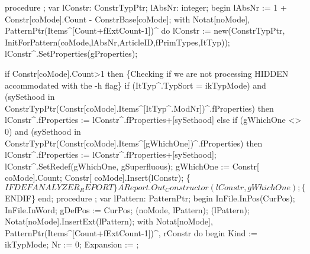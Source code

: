 \nwenddocs{}\endmoddef\nwstartdeflinemarkup{}\nwenddeflinemarkup
procedure ;
var
   lConstr: ConstrTypPtr;
   lAbsNr: integer;
begin
   lAbsNr :=  1 + Constr[coMode].Count - ConstrBase[coMode];
   with Notat[noMode], PatternPtr(Items^[Count+fExtCount-1])^ do
   lConstr := new(ConstrTypPtr,
                  InitForPattern(coMode,lAbsNr,ArticleID,fPrimTypes,ItTyp));
   lConstr^.SetProperties(gProperties);
   
   if Constr[coMode].Count>1 then \{Checking if we are not processing HIDDEN accommodated with the -h flag\}
      if (ItTyp^.TypSort = ikTypMode) and
            (sySethood in ConstrTypPtr(Constr[coMode].Items^[ItTyp^.ModNr])^.fProperties) then
         lConstr^.fProperties := lConstr^.fProperties+[sySethood]
      else if (gWhichOne <> 0) and
                 (sySethood in ConstrTypPtr(Constr[coMode].Items^[gWhichOne])^.fProperties) then
         lConstr^.fProperties := lConstr^.fProperties+[sySethood];
   lConstr^.SetRedef(gWhichOne, gSuperfluous);
   gWhichOne :=  Constr[ coMode].Count;
   Constr[ coMode].Insert(lConstr);
   \{$IFDEF ANALYZER_REPORT\}
   AReport.Out_Constructor(lConstr, gWhichOne);
   \{$ENDIF\}
end;
\eatline
{}\nwendcode{}\nwdocspar
\nwenddocs{}\endmoddef\nwstartdeflinemarkup{}\nwenddeflinemarkup
procedure ;
var
   lPattern: PatternPtr;
begin
   InFile.InPos(CurPos);
   InFile.InWord;
   gDefPos := CurPos;
   (noMode, lPattern);
   (lPattern);
   Notat[noMode].InsertExt(lPattern);
   with Notat[noMode], PatternPtr(Items^[Count+fExtCount-1])^, rConstr do
   begin
      Kind := ikTypMode;
      Nr := 0;
      Expansion := ;
